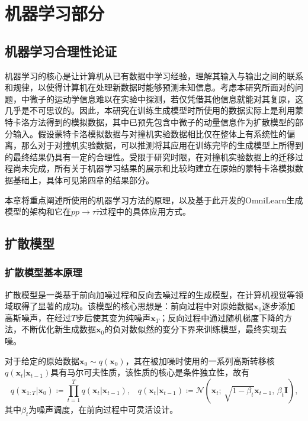 \chapter{机器学习部分}
\label{chap:machinelearning}

\section{机器学习合理性论证}
\label{sec:threepone}
机器学习的核心是让计算机从已有数据中学习经验，理解其输入与输出之间的联系和规律，以使得计算机在处理新数据时能够预测未知信息。考虑本研究所面对的问题，中微子的运动学信息难以在实验中探测，若仅凭借其他信息就能对其复原，这几乎是不可思议的。因此，本研究在训练生成模型时所使用的数据实际上是利用蒙特卡洛方法得到的模拟数据，其中已预先包含中微子的动量信息作为扩散模型的部分输入。假设蒙特卡洛模拟数据与对撞机实验数据相比仅在整体上有系统性的偏离，那么对于对撞机实验数据，可以推测将其应用在训练完毕的生成模型上所得到的最终结果仍具有一定的合理性。受限于研究时限，在对撞机实验数据上的迁移过程尚未完成，所有关于机器学习结果的展示和比较均建立在原始的蒙特卡洛模拟数据基础上，具体可见第四章的结果部分。

本章将重点阐述所使用的机器学习方法的原理，以及基于此开发的OmniLearn生成模型的架构和它在$pp \to \tau \bar{\tau}$过程中的具体应用方式。
\section{扩散模型}
\label{sec:threeptwo}
\subsection{扩散模型基本原理}
\label{sec:threeptwopone}
扩散模型\cite{ref9, ref10}是一类基于前向加噪过程和反向去噪过程的生成模型，在计算机视觉等领域取得了显著的成功。该模型的核心思想是：前向过程中对原始数据$\boldsymbol{x}_0$逐步添加高斯噪声，在经过$T$步后使其变为纯噪声$\boldsymbol{x}_T$；反向过程中通过随机梯度下降的方法，不断优化新生成数据$\boldsymbol{x}_0$的负对数似然的变分下界来训练模型，最终实现去噪。

对于给定的原始数据$\boldsymbol{x}_0 \sim q(\boldsymbol{x}_0)$，其在被加噪时使用的一系列高斯转移核$q(\boldsymbol{x}_t \vert \boldsymbol{x}_{t-1})$具有马尔可夫性质，该性质的核心是条件独立性，故有
\begin{equation*}
q(\boldsymbol{x}_{1:T} \vert \boldsymbol{x}_0) \coloneqq \prod\limits_{t=1}^T q(\boldsymbol{x}_t \vert \boldsymbol{x}_{t-1})\text{,}\quad q(\boldsymbol{x}_t \vert \boldsymbol{x}_{t-1}) \coloneqq \mathcal{N}(\boldsymbol{x}_t\text{; } \sqrt{1-\beta_t} \boldsymbol{x}_{t-1}\text{, } \beta_t \mathbf{I})\text{,}
\tag{3.1}
\end{equation*}
\noindent 其中$\beta_t$为噪声调度，在前向过程中可灵活设计。

